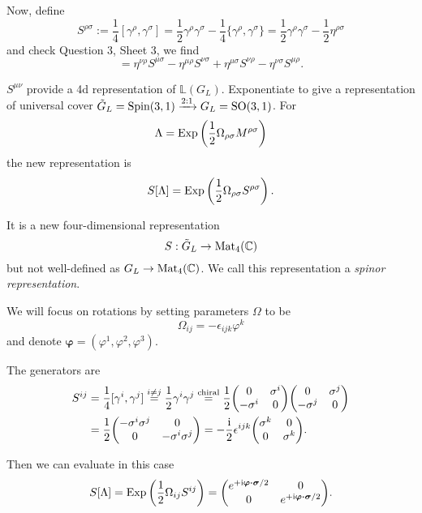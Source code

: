 \documentclass[a4paper,11pt]{article}
\begin{document}
	Now, define 
	\begin{equation}
		S ^{\rho \sigma} := \frac{1}{4} [\gamma^\rho, \gamma^\sigma] = \frac{1}{2} \gamma^\rho \gamma^\sigma - \frac{1}{4} \{\gamma^\rho, \gamma^\sigma\} = \frac{1}{2} \gamma^\rho \gamma^\sigma - \frac{1}{2} \eta ^{\rho \sigma}
		\label{eq:4.1.4}
	\end{equation}
	and check Question 3, Sheet 3, we find
	\begin{equation}
		[S ^{\mu \nu}, S ^{\rho \sigma}] = \eta ^{\nu \rho} S ^{\mu \sigma} - \eta ^{\mu \rho} S ^{\nu \sigma} + \eta ^{\mu \sigma} S ^{\nu \rho} - \eta ^{\nu \sigma} S ^{\mu \rho}.
		\label{eq:4.1.5}
	\end{equation}

	$S ^{\mu \nu}$ provide a 4d representation of $\mathbb{L}(G_L)$. Exponentiate to give a representation of universal cover $\tilde G_L = \text{Spin}(3,1) \xrightarrow{2:1} G_L = \operatorname{SO}(3,1)$. For 
	\[
		\Lambda = \operatorname{Exp} \left( \frac{1}{2} \Omega _{\rho \sigma} M ^{\rho \sigma} \right)
	\]
	the new representation is
	\[
		S[\Lambda] = \operatorname{Exp} \left( \frac{1}{2} \Omega _{\rho \sigma} S ^{\rho \sigma} \right).
	\]
	 
	It is a new four-dimensional representation 
	\[
		S : \tilde G_L \to \operatorname{Mat}_4 (\mathbb{C})
	\]
	but not well-defined as $G_L \to \operatorname{Mat}_4(\mathbb{C})$. We call this representation a \emph{spinor representation}.
	

	We will focus on rotations by setting parameters $\Omega$ to be
	\[
		\Omega _{ij} = - \epsilon _{ijk} \varphi^k
	\]
	and denote $\bm \varphi = (\varphi^1, \varphi^2, \varphi^3)$.

	The generators are
	\begin{align*}
		S ^{ij} & = \frac{1}{4} [\gamma^i, \gamma^j] \overset{i \neq j}{=} \frac{1}{2} \gamma^i \gamma^j\overset{\text{chiral}}{=} \frac{1}{2} \mqty(0 & \sigma^i\\ - \sigma^i & 0) \mqty(0 & \sigma^j \\ - \sigma^j & 0)\\
		& = \frac{1}{2} \mqty(- \sigma^i \sigma^j & 0 \\ 0 & - \sigma^i \sigma^j) = - \frac{\mathrm{i}}{2} \epsilon ^{ijk} \mqty(\sigma^k & 0 \\ 0 & \sigma^k).
	\end{align*}

	Then we can evaluate in this case
	\[
		S[\Lambda] = \Exp\left( \frac{1}{2} \Omega _{ij} S ^{ij} \right) = \mqty( e ^{+ \mathrm{i} \bm \varphi \vdot \bm \sigma/2} & 0 \\ 0 & e ^{+\mathrm{i} \bm \varphi \vdot \bm \sigma/2}).
	\]
	
\end{document}
